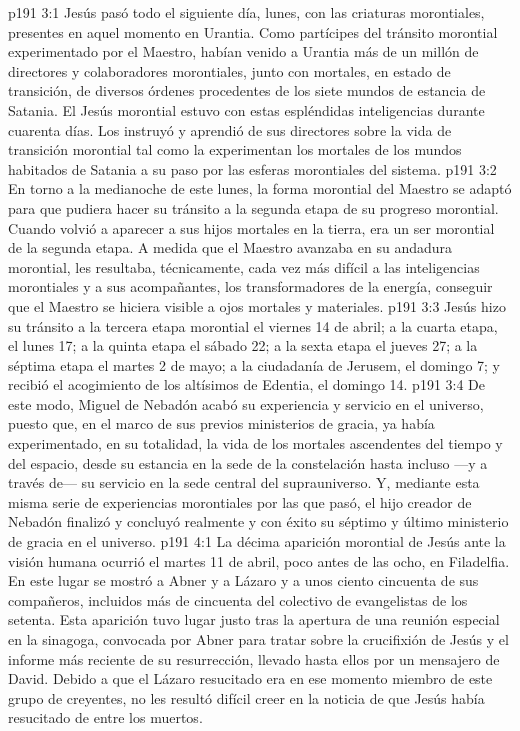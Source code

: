 \vs p191 3:1 Jesús pasó todo el siguiente día, lunes, con las criaturas morontiales, presentes en aquel momento en Urantia. Como partícipes del tránsito morontial experimentado por el Maestro, habían venido a Urantia más de un millón de directores y colaboradores morontiales, junto con mortales, en estado de transición, de diversos órdenes procedentes de los siete mundos de estancia de Satania. El Jesús morontial estuvo con estas espléndidas inteligencias durante cuarenta días. Los instruyó y aprendió de sus directores sobre la vida de transición morontial tal como la experimentan los mortales de los mundos habitados de Satania a su paso por las esferas morontiales del sistema.
\vs p191 3:2 En torno a la medianoche de este lunes, la forma morontial del Maestro se adaptó para que pudiera hacer su tránsito a la segunda etapa de su progreso morontial. Cuando volvió a aparecer a sus hijos mortales en la tierra, era un ser morontial de la segunda etapa. A medida que el Maestro avanzaba en su andadura morontial, les resultaba, técnicamente, cada vez más difícil a las inteligencias morontiales y a sus acompañantes, los transformadores de la energía, conseguir que el Maestro se hiciera visible a ojos mortales y materiales.
\vs p191 3:3 Jesús hizo su tránsito a la tercera etapa morontial el viernes 14 de abril; a la cuarta etapa, el lunes 17; a la quinta etapa el sábado 22; a la sexta etapa el jueves 27; a la séptima etapa el martes 2 de mayo; a la ciudadanía de Jerusem, el domingo 7; y recibió el acogimiento de los altísimos de Edentia, el domingo 14.
\vs p191 3:4 De este modo, Miguel de Nebadón acabó su experiencia y servicio en el universo, puesto que, en el marco de sus previos ministerios de gracia, ya había experimentado, en su totalidad, la vida de los mortales ascendentes del tiempo y del espacio, desde su estancia en la sede de la constelación hasta incluso ---y a través de--- su servicio en la sede central del suprauniverso. Y, mediante esta misma serie de experiencias morontiales por las que pasó, el hijo creador de Nebadón finalizó y concluyó realmente y con éxito su séptimo y último ministerio de gracia en el universo.
\vs p191 4:1 La décima aparición morontial de Jesús ante la visión humana ocurrió el martes 11 de abril, poco antes de las ocho, en Filadelfia. En este lugar se mostró a Abner y a Lázaro y a unos ciento cincuenta de sus compañeros, incluidos más de cincuenta del colectivo de evangelistas de los setenta. Esta aparición tuvo lugar justo tras la apertura de una reunión especial en la sinagoga, convocada por Abner para tratar sobre la crucifixión de Jesús y el informe más reciente de su resurrección, llevado hasta ellos por un mensajero de David. Debido a que el Lázaro resucitado era en ese momento miembro de este grupo de creyentes, no les resultó difícil creer en la noticia de que Jesús había resucitado de entre los muertos.
